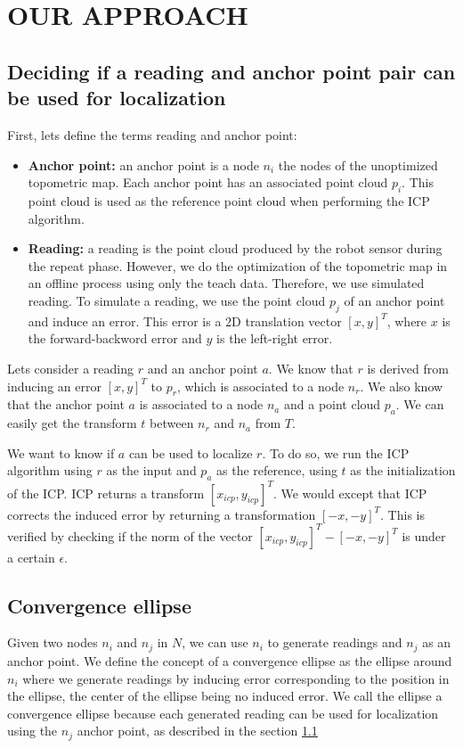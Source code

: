 \documentclass[letterpaper,10 pt,conference]{ieeeconf}
\begin{document}
\section{OUR APPROACH}
\label{approach}

\subsection{Deciding if a reading and anchor point pair can be used for localization}
\label{approach-deciding-converge}

First, lets define the terms reading and anchor point:

\begin{itemize}
  \item \textbf{Anchor point:} an anchor point is a node $n_i$ the nodes of the unoptimized
    topometric map. Each anchor point has an associated point cloud $p_i$. This point cloud is used
    as the reference point cloud when performing the ICP algorithm.
  \item \textbf{Reading:} a reading is the point cloud produced by the robot sensor during the
    repeat phase. However, we do the optimization of the topometric map in an offline process using
only the teach data. Therefore, we use simulated reading. To simulate a reading, we use the point
cloud $p_j$ of an anchor point and induce an error. This error is a 2D translation vector $[x,y]^T$, where $x$ is the forward-backword error and $y$ is the left-right error.
\end{itemize}

Lets consider a reading $r$ and an anchor point $a$. We know that $r$ is derived from inducing an error $[x, y]^T$ to $p_r$, which is associated to a node $n_r$.
We also know that the anchor point $a$ is associated to a node $n_a$ and a point cloud $p_a$. We can easily get the transform $t$ between $n_r$ and $n_a$ from $T$.


We want to know if $a$ can be used to localize $r$. To do so, we run the ICP algorithm using $r$ as the input and $p_a$ as the reference, using $t$
as the initialization of the ICP. ICP returns a transform $[x_{icp}, y_{icp}]^T$. We would except that ICP corrects the induced error by returning
a transformation $[-x, -y]^T$. This is verified by checking if the norm of the vector $[x_{icp}, y_{icp}]^T - [-x, -y]^T$ is under a certain $\epsilon$.


\subsection{Convergence ellipse}
Given two nodes $n_i$ and $n_j$ in $N$, we can use $n_i$ to generate readings and $n_j$ as an anchor
point.  We define the concept of a convergence ellipse as the ellipse around $n_i$ where we generate
readings by inducing error corresponding to the position in the ellipse, the center of the ellipse
being no induced error. We call the ellipse a convergence ellipse because each generated reading can
be used for localization using the $n_j$ anchor point, as described in the section
\ref{approach-deciding-converge}
\end{document}
